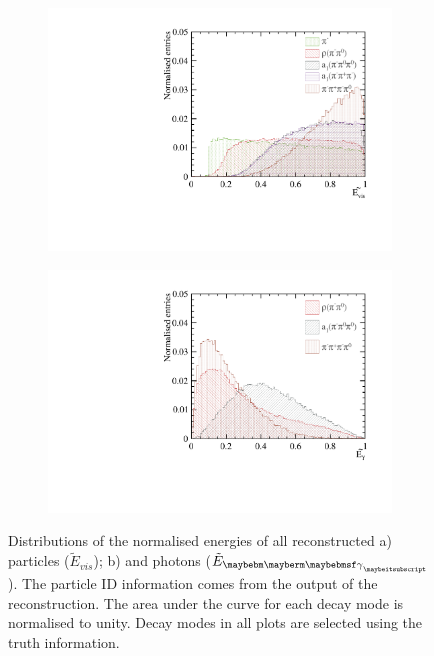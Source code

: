 \begin{figure}[htbp]
\centering
\begin{subfigure}[b]{0.45\textwidth}
 \includegraphics[width=\textwidth]{tau/eVisRatio_100GeV_improved_zoom.pdf}
  \caption{}
  \label{fig:tauVarEVis}
\end{subfigure}
\begin{subfigure}[b]{0.45\textwidth}
 \includegraphics[width=\textwidth]{tau/ePhotonRatio_100GeV_improved_zoom.pdf}
  \caption{}
  \label{fig:tauVarEPhoton}
\end{subfigure}
\caption
{Distributions of  the normalised energies of all reconstructed a) particles ($\tilde{E}_{vis}$); b) and photons ($\tilde{E}_{\Pgg}$). The particle ID information comes from the output of the \pandora reconstruction. The area under the curve for each decay mode is normalised to unity. Decay modes in all plots are selected using the truth information.}
\label{fig:tauVar3}
\end{figure}

